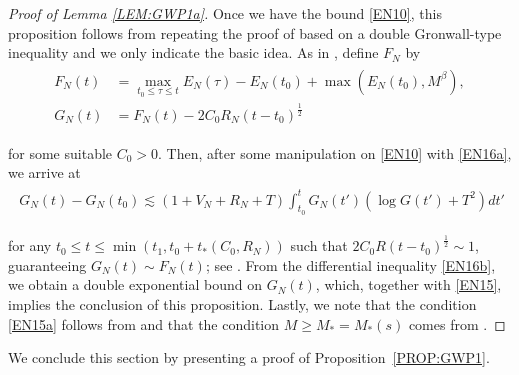 \documentclass[letterpaper, 11pt,  reqno]{amsart}
\newcommand{\1}{\hspace{0.5mm}\text{I}\hspace{0.2mm}}
\newcommand{\noi}{\noindent}
\newcommand{\be}{\beta}
\newcommand{\les}{\lesssim}
\newcommand{\EN}{E_N}
\numberwithin{equation}{section}
\numberwithin{theorem}{section}
\begin{document}
\begin{proof}
[Proof of Lemma \ref{LEM:GWP1a}]
Once we have the bound \eqref{EN10}, 
this proposition follows from repeating
the proof of 
\cite[Proposition~3.5]{GKOT}
based on a 
double Gronwall-type inequality
and %
we only indicate the basic idea.
As in \cite[(3.32) and (3.38)]{GKOT}, 
define $F_N$ by 
\begin{align}
\begin{split}
 F_N(t) & = \max_{t_0 \le \tau \le t}  \EN(\tau) - \EN(t_0) + \max(\EN(t_0), M^\be), \\
 G_N(t) & = F_N(t) - 2 C_0 R_N (t - t_0)^\frac{1}{2}
\end{split}
\label{EN16a}
\end{align}


\noi
for some suitable $C_0 > 0$.
Then, after some manipulation on 
\eqref{EN10} with \eqref{EN16a}, 
we arrive at 
\begin{align} 
\begin{split}
G_N(t)  -  G_N(t_0) 
\les (1 + V_N + R_N  + T)
\int_{t_0}^{t}  G_N(t') (\log G(t') + T^2)  dt'
\end{split}
\label{EN16b}
\end{align}

\noi
for any $t_0 \le t \le \min( t_1, t_0 + t_*(C_0, R_N))$
such that 
$2 C_0 R (t - t_0)^\frac{1}{2} \sim 1$, 
guaranteeing
$G_N(t) \sim F_N(t)$;
see \cite[(3.39)]{GKOT}.
From the differential inequality \eqref{EN16b}, 
we obtain a double exponential bound on $G_N(t)$,
which, together with \eqref{EN15}, 
implies the conclusion of this proposition.
Lastly, we note that 
the condition \eqref{EN15a} follows from 
\cite[(3.36)]{GKOT}
and that 
the condition
$M \ge M_* = M_*(s)$
comes from 
\cite[(3.45) and (3.46)]{GKOT}.
\end{proof}










We conclude this section by presenting
a proof of
 Proposition~\ref{PROP:GWP1}.
\end{document}
